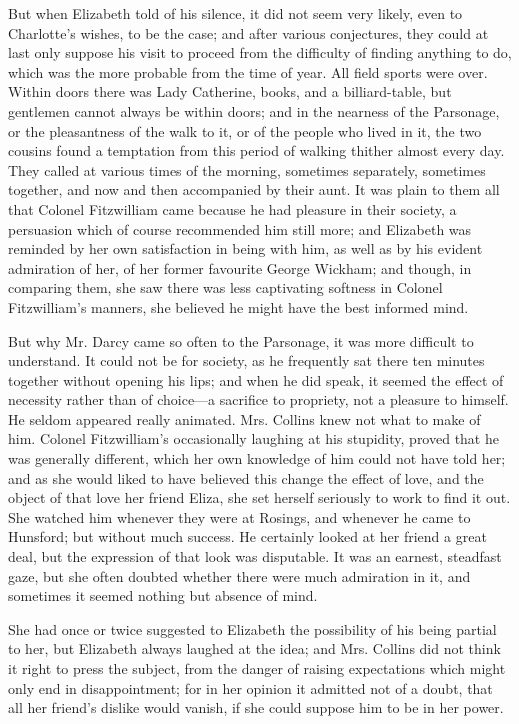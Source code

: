 But when Elizabeth told of his silence, it did not seem very likely, even to Charlotte's wishes, to be the case; and after various conjectures, they could at last only suppose his visit to proceed from the difficulty of finding anything to do, which was the more probable from the time of year. All field sports were over. Within doors there was Lady Catherine, books, and a billiard-table, but gentlemen cannot always be within doors; and in the nearness of the Parsonage, or the pleasantness of the walk to it, or of the people who lived in it, the two cousins found a temptation from this period of walking thither almost every day. They called at various times of the morning, sometimes separately, sometimes together, and now and then accompanied by their aunt. It was plain to them all that Colonel Fitzwilliam came because he had pleasure in their society, a persuasion which of course recommended him still more; and Elizabeth was reminded by her own satisfaction in being with him, as well as by his evident admiration of her, of her former favourite George Wickham; and though, in comparing them, she saw there was less captivating softness in Colonel Fitzwilliam's manners, she believed he might have the best informed mind.

But why Mr. Darcy came so often to the Parsonage, it was more difficult to understand. It could not be for society, as he frequently sat there ten minutes together without opening his lips; and when he did speak, it seemed the effect of necessity rather than of choice---a sacrifice to propriety, not a pleasure to himself. He seldom appeared really animated. Mrs. Collins knew not what to make of him. Colonel Fitzwilliam's occasionally laughing at his stupidity, proved that he was generally different, which her own knowledge of him could not have told her; and as she would liked to have believed this change the effect of love, and the object of that love her friend Eliza, she set herself seriously to work to find it out. She watched him whenever they were at Rosings, and whenever he came to Hunsford; but without much success. He certainly looked at her friend a great deal, but the expression of that look was disputable. It was an earnest, steadfast gaze, but she often doubted whether there were much admiration in it, and sometimes it seemed nothing but absence of mind.

She had once or twice suggested to Elizabeth the possibility of his being partial to her, but Elizabeth always laughed at the idea; and Mrs. Collins did not think it right to press the subject, from the danger of raising expectations which might only end in disappointment; for in her opinion it admitted not of a doubt, that all her friend's dislike would vanish, if she could suppose him to be in her power.


